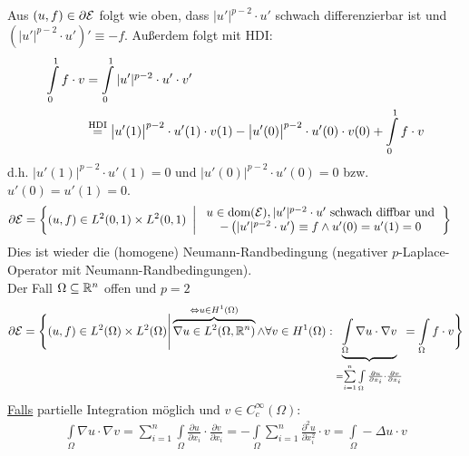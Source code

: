 \begin{beispiel}
Aus $(u,f)\in\partial\mathcal{E}$ folgt wie oben, dass $|u'|^{p-2}\cdot u'$ schwach differenzierbar ist und\\ $\left(|u'|^{p-2}\cdot u'\right)'\equiv -f$. Außerdem folgt mit HDI:
\begin{align*}
\int\limits_0^1 f\cdot v
&=\int\limits_0^1|u'|^{p-2}\cdot u'\cdot v'\\
&\stackrel{\text{HDI}}{=}
\big| u'(1)\big|^{p-2}\cdot u'(1)\cdot v(1)-
\big| u'(0)\big|^{p-2}\cdot u'(0)\cdot v(0)+\int\limits_0^1 f\cdot v
\end{align*}
d.h. $\big|u'(1)\big|^{p-2}\cdot u'(1)=0$ und $\big|u'(0)\big|^{p-2}\cdot u'(0)=0$ bzw. $u'(0)=u'(1)=0$.
\begin{align*}
\partial\mathcal{E}&=\left\lbrace(u,f)\in L^2(0,1)\times L^2(0,1)~\left|~
\begin{array}{c}
u\in\text{dom}(\mathcal{E}),|u'|^{p-2}\cdot u'\text{ schwach diffbar und}\\-\left(|u'|^{p-2}\cdot u'\right)\equiv f\wedge u'(0)=u'(1)=0
\end{array}
\right.\right\rbrace
\end{align*}
Dies ist wieder die (homogene) Neumann-Randbedingung (negativer $p$-Laplace-Operator mit Neumann-Randbedingungen).\\
Der Fall $\Omega\subseteq\mathbb{R}^n$ offen und $p=2$
\begin{align*}
\partial\mathcal{E}=\Bigg\lbrace(u,f)\in L^2(\Omega)\times L^2(\Omega)\Bigg|\overbrace{\nabla u\in L^2(\Omega,\mathbb{R}^n)}^{\Leftrightarrow u\in H^1(\Omega)}\wedge\forall v\in H^1(\Omega):\underbrace{\int\limits_\Omega\nabla u\cdot \nabla v}_{=\sum\limits_{i=1}^n\int\limits_\Omega\frac{\partial u}{\partial x_i}\cdot\frac{\partial v}{\partial x_i}}=\int\limits_\Omega f\cdot v\Bigg\rbrace
\end{align*}
\underline{Falls} partielle Integration möglich und $v\in C^\infty_c(\Omega)$:
\begin{align*}
\int\limits_\Omega\nabla u\cdot \nabla v=\sum\limits_{i=1}^n\int\limits_\Omega\frac{\partial u}{\partial x_i}\cdot\frac{\partial v}{\partial x_i}=-\int\limits_\Omega\sum\limits_{i=1}^n\frac{\partial^2 u}{\partial x_i^2}\cdot v
=\int\limits_\Omega-\Delta u\cdot v
\end{align*}


\end{beispiel}

